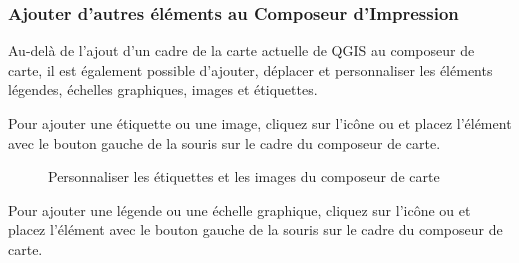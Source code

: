 {%
\subsubsection{Ajouter d'autres éléments au Composeur d'Impression}

Au-delà de l'ajout d'un cadre de la carte actuelle de QGIS au composeur de
carte, il est également possible d'ajouter, déplacer et personnaliser les
éléments légendes, échelles graphiques, images et étiquettes.


Pour ajouter une étiquette ou une image, cliquez sur l'icône
 ou
 et placez l'élément avec
le bouton gauche de la souris sur le cadre du composeur de carte.

\begin{figure}[ht]
\centering
\caption{Personnaliser les étiquettes et les images du composeur de carte
\nixcaption}\label{fig:print_composer_tab2}
   \goodgap
\end{figure}


Pour ajouter une légende ou une échelle graphique, cliquez sur l'icône
 ou
 et placez
l'élément avec le bouton gauche de la souris sur le cadre du composeur de carte.

}
